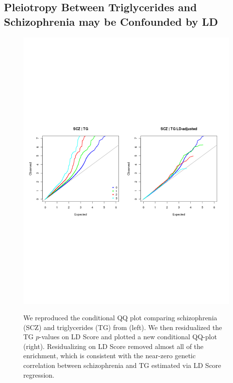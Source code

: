 \documentclass[11pt]{article}
\numberwithin{equation}{section}
\numberwithin{definition}{section}
\numberwithin{thm}{section}
\numberwithin{lemma}{section}
\numberwithin{prop}{section}
\numberwithin{cor}{section}
\numberwithin{hyp}{section}
\begin{document}
\subsection{Pleiotropy Between Triglycerides and Schizophrenia may be Confounded by LD}
\begin{figure}[!ht]

\begin{centering}
    \includegraphics[scale=0.6]{figs/qq_TG.pdf}
         \label{qq_tg}

We reproduced the conditional QQ plot comparing schizophrenia (SCZ) and triglycerides (TG) from \cite{andreassen2013improved} (left).
We then residualized the TG $p$-values on LD Score and plotted a new conditional QQ-plot (right). 
Residualizing on LD Score removed almost all of the enrichment, which is consistent with the 
near-zero genetic correlation between schizophrenia and TG estimated via LD Score regression.

\end{centering}
\end{figure}
\newpage
\end{document}
